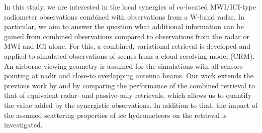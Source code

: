 \documentclass[journal abbreviation, manuscript]{copernicus}
\begin{document}
In this study, we are interested in the local synergies of co-located
MWI/ICI-type radiometer observations combined with observations from a W-band
radar. In particular, we aim to answer the question what additional information
can be gained from combined observations compared to observations from the radar
or MWI and ICI alone. For this, a combined, variational retrieval is developed
and applied to simulated observations of scenes from a cloud-resolving model
(CRM). An airborne viewing geometry is assumed for the simulations with all
sensors pointing at nadir and close-to overlapping antenna beams. Our work
extends the previous work by \citet{evans05} and \citet{jiang19} by comparing
the performance of the combined retrieval to that of equivalent radar- and
passive-only retrievals, which allows us to quantify the value added by the
synergistic observations. In addition to that, the impact of the assumed
scattering properties of ice hydrometeors on the retrieval is investigated.

%
\end{document}
